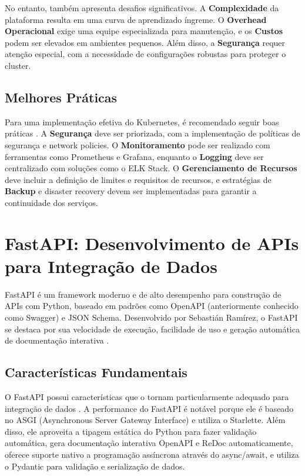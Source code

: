 No entanto, também apresenta desafios significativos. A \textbf{Complexidade} da plataforma resulta em uma curva de aprendizado íngreme. O \textbf{Overhead Operacional} exige uma equipe especializada para manutenção, e os \textbf{Custos} podem ser elevados em ambientes pequenos. Além disso, a \textbf{Segurança} requer atenção especial, com a necessidade de configurações robustas para proteger o cluster.

\subsection{Melhores Práticas}

Para uma implementação efetiva do Kubernetes, é recomendado seguir boas práticas \cite{arundel2021kubernetes}. A \textbf{Segurança} deve ser priorizada, com a implementação de políticas de segurança e network policies. O \textbf{Monitoramento} pode ser realizado com ferramentas como Prometheus e Grafana, enquanto o \textbf{Logging} deve ser centralizado com soluções como o ELK Stack. O \textbf{Gerenciamento de Recursos} deve incluir a definição de limites e requisitos de recursos, e estratégias de \textbf{Backup} e disaster recovery devem ser implementadas para garantir a continuidade dos serviços.


\section{FastAPI: Desenvolvimento de APIs para Integração de Dados}
FastAPI é um framework moderno e de alto desempenho para construção de APIs com Python, baseado em padrões como OpenAPI (anteriormente conhecido como Swagger) e JSON Schema. Desenvolvido por Sebastián Ramírez, o FastAPI se destaca por sua velocidade de execução, facilidade de uso e geração automática de documentação interativa \cite{fastapi_foundation}.
\subsection{Características Fundamentais}
O FastAPI possui características que o tornam particularmente adequado para integração de dados \cite{ramirez2022fastapi}. A performance do FastAPI é notável porque ele é baseado no ASGI (Asynchronous Server Gateway Interface) e utiliza o Starlette. Além disso, ele aproveita a tipagem estática do Python para fazer validação automática, gera documentação interativa OpenAPI e ReDoc automaticamente, oferece suporte nativo a programação assíncrona através do async/await, e utiliza o Pydantic para validação e serialização de dados.
